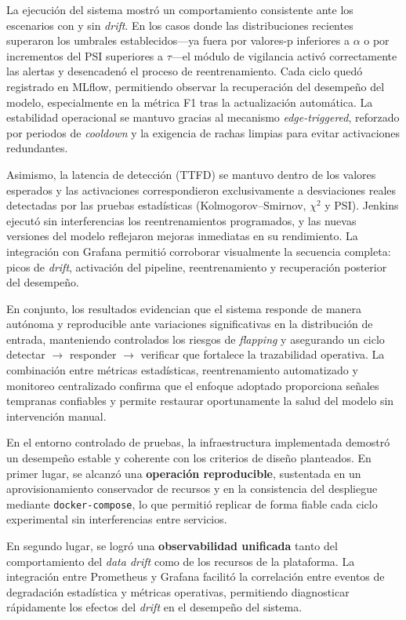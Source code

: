 La ejecución del sistema mostró un comportamiento consistente ante los escenarios con y sin \textit{drift}. En los casos donde las distribuciones recientes superaron los umbrales establecidos—ya fuera por valores-p inferiores a $\alpha$ o por incrementos del PSI superiores a $\tau$—el módulo de vigilancia activó correctamente las alertas y desencadenó el proceso de reentrenamiento. Cada ciclo quedó registrado en MLflow, permitiendo observar la recuperación del desempeño del modelo, especialmente en la métrica F1 tras la actualización automática. La estabilidad operacional se mantuvo gracias al mecanismo \textit{edge-triggered}, reforzado por periodos de \textit{cooldown} y la exigencia de rachas limpias para evitar activaciones redundantes.

Asimismo, la latencia de detección (TTFD) se mantuvo dentro de los valores esperados y las activaciones correspondieron exclusivamente a desviaciones reales detectadas por las pruebas estadísticas (Kolmogorov--Smirnov, $\chi^2$ y PSI). Jenkins ejecutó sin interferencias los reentrenamientos programados, y las nuevas versiones del modelo reflejaron mejoras inmediatas en su rendimiento. La integración con Grafana permitió corroborar visualmente la secuencia completa: picos de \textit{drift}, activación del pipeline, reentrenamiento y recuperación posterior del desempeño.

En conjunto, los resultados evidencian que el sistema responde de manera autónoma y reproducible ante variaciones significativas en la distribución de entrada, manteniendo controlados los riesgos de \textit{flapping} y asegurando un ciclo detectar $\rightarrow$ responder $\rightarrow$ verificar que fortalece la trazabilidad operativa. La combinación entre métricas estadísticas, reentrenamiento automatizado y monitoreo centralizado confirma que el enfoque adoptado proporciona señales tempranas confiables y permite restaurar oportunamente la salud del modelo sin intervención manual.


En el entorno controlado de pruebas, la infraestructura implementada demostró un desempeño estable y coherente con los criterios de diseño planteados.  
En primer lugar, se alcanzó una \textbf{operación reproducible}, sustentada en un aprovisionamiento conservador de recursos y en la consistencia del despliegue mediante \texttt{docker-compose}, lo que permitió replicar de forma fiable cada ciclo experimental sin interferencias entre servicios.  

En segundo lugar, se logró una \textbf{observabilidad unificada} tanto del comportamiento del \textit{data drift} como de los recursos de la plataforma.  
La integración entre Prometheus y Grafana facilitó la correlación entre eventos de degradación estadística y métricas operativas, permitiendo diagnosticar rápidamente los efectos del \textit{drift} en el desempeño del sistema.  

